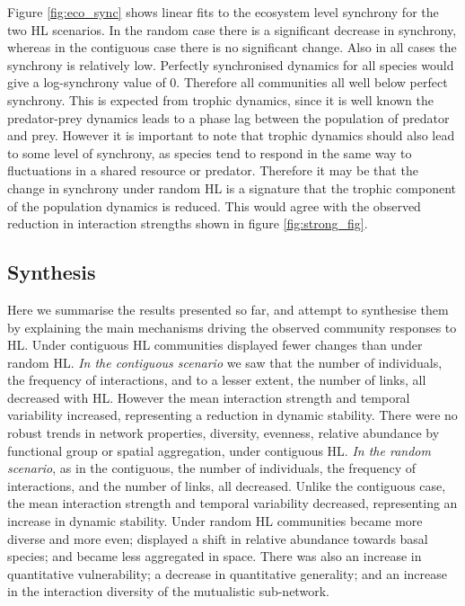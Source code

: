 Figure \ref{fig:eco_sync} shows linear fits to the ecosystem level synchrony for the two HL scenarios. In the random case there is a significant decrease in synchrony, whereas in the contiguous case there is no significant change. Also in all cases the synchrony is relatively low. Perfectly synchronised dynamics for all species would give a log-synchrony value of 0. Therefore all communities all well below perfect synchrony. This is expected from trophic dynamics, since it is well known the predator-prey dynamics leads to a phase lag between the population of predator and prey. However it is important to note that trophic dynamics should also lead to some level of synchrony, as species tend to respond in the same way to fluctuations in a shared resource or predator. Therefore it may be that the change in synchrony under random HL is a signature that the trophic component of the population dynamics is reduced. This would agree with the observed reduction in interaction strengths shown in figure \ref{fig:strong_fig}.    

\clearpage
\subsection{Synthesis}
\label{sec:res_synthesis}

Here we summarise the results presented so far, and attempt to synthesise them by explaining the main mechanisms driving the observed community responses to HL. Under contiguous HL communities displayed fewer changes than under random HL. \emph{In the contiguous scenario} we saw that the number of individuals,  the frequency of interactions, and to a lesser extent, the number of links, all decreased with HL. However the mean interaction strength and temporal variability increased, representing a reduction in dynamic stability. There were no robust trends in network properties, diversity, evenness, relative abundance by functional group or spatial aggregation, under contiguous HL. \emph{In the random scenario}, as in the contiguous, the number of individuals, the frequency of interactions, and the number of links, all decreased. Unlike the contiguous case, the mean interaction strength and temporal variability decreased, representing an increase in dynamic stability. Under random HL communities became more diverse and more even; displayed a shift in relative abundance towards basal species; and became less aggregated in space. There was also an increase in quantitative vulnerability; a decrease in quantitative generality; and an increase in the interaction diversity of the mutualistic sub-network.

